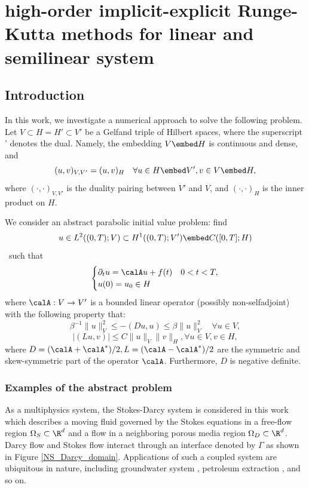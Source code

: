 
\chapter[Long-Time Linear]{high-order implicit-explicit
Runge-Kutta methods for linear and semilinear system}



\section{Introduction}\label{Sec:intro}
In this work, we investigate a numerical approach to solve the following problem. 
Let $V \subset H = H' \subset V'$ be a Gelfand triple of Hilbert spaces, 
where the superscript ' denotes the dual. 
Namely, the embedding $V\embed H$ is continuous and dense, and 
$$(u, v)_{V, V'} = (u,v)_H \quad \forall u \in H \embed V', v \in V \embed H,$$
where $(\cdot, \cdot)_{V, V'}$ is the duality pairing between $V'$ and $V$, 
and $(\cdot,\cdot)_H$ is the inner product on $H$. 

We consider an abstract parabolic initial value problem: 
find
$$u \in L^2((0,T);V) \subset H^1((0,T);V')\embed C([0,T];H)$$\
such that 
\begin{equation}\label{eq:abstract}
    \begin{cases}
    \partial_t u = \calA u + f(t) & 0 < t < T,\\
    u(0) = u_0  \in H
  \end{cases}
\end{equation}
where $\calA: V \to V'$ is a bounded linear operator (possibly non-selfadjoint) 
with the following property that:
$$\beta^{-1}\|u\|_V^2 \leq -(Du, u) \leq \beta \|u\|_V^2 \quad \forall u \in V, $$
$$ \lvert(Lu, v)\rvert \leq C \|u\|_V \|v\|_H, 
\forall u\in V, v \in H,$$
where $D = (\calA+\calA^*)/2, L = (\calA-\calA^*)/2$ are the symmetric and skew-symmetric 
part of the operator $\calA$. Furthermore, $D$ is negative definite. 

\subsection{Examples of the abstract problem}
As a multiphysics system, the Stokes-Darcy system is considered in this work which describes a moving fluid governed by the Stokes equations in a free-flow region $\Omega_S\subset\R^d$ and a flow in a neighboring  porous media region $\Omega_D\subset\R^d$. Darcy flow and Stokes flow interact through an interface denoted by $\Gamma$ as shown in Figure \ref{NS_Darcy_domain}. Applications of such a coupled system are ubiquitous in nature, including groundwater system \cite{HoppePortaVassilevski:2007,HouQiuHeGuoWeiBai:2016,LaytonTranTrenchea:2013}, petroleum extraction \cite{ChenSunWang:2014}, and so on.

